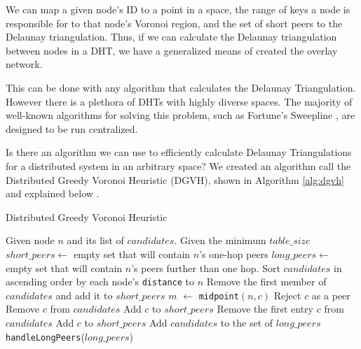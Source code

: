\documentclass[11pt,conference]{IEEEtran}
\begin{document}
We can map a given node's ID to a point in a space, the range of keys a node is responsible for to that node's Voronoi region, and the set of short peers to the Delaunay triangulation.
Thus, if we can calculate the Delaunay triangulation between nodes in a DHT, we have a generalized means of created the overlay network.

This can be done with any algorithm that calculates the Delaunay Triangulation.
However there is a plethora of DHTs with highly diverse spaces. 
The majority of well-known algorithms for solving this problem, such as Fortune's Sweepline \cite{fortune1987sweepline}, are designed to be run centralized.

Is there an algorithm we can use to efficiently calculate Delaunay Triangulations for a distributed system in an arbitrary space?
We created an algorithm call the Distributed Greedy Voronoi Heuristic (DGVH), shown in Algorithm \ref{alg:dgvh} and explained below \cite{dgvh}.


\begin{algorithm} %
	\caption{Distributed Greedy Voronoi Heuristic}
	\label{alg:dgvh}
	\begin{algorithmic}[1]  %
		\STATE Given node $n$ and its list of $candidates$.
		\STATE Given the minimum $table\_size$
		\STATE $short\_peers \leftarrow$ empty set that will contain $n$'s one-hop peers
		\STATE $long\_peers \leftarrow$ empty set that will contain $n$'s peers further than one hop.
		\STATE Sort $candidates$ in ascending order by each node's \texttt{distance} to $n$
		\STATE Remove the first member of $candidates$ and add it to $short\_peers$
			\STATE $m$ $ \leftarrow $ \texttt{midpoint}$( n, c )$
				\STATE Reject $c$ as a peer
			\ELSE
				\STATE Remove $c$ from $candidates$
				\STATE Add $c$ to $short\_peers$
			\ENDIF
		\ENDFOR
			\STATE Remove the first entry $c$ from $candidates$
			\STATE Add $c$ to $short\_peers$
		\ENDWHILE
		\STATE Add $candidates$ to the set of $long\_peers$	
		\STATE \texttt{handleLongPeers}($long\_peers$)
	\end{algorithmic}
\end{algorithm} 
\end{document}
